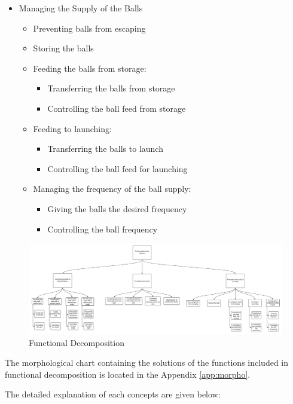 \documentclass[12pt]{article}
\begin{document}
\begin{itemize}
    \item Managing the Supply of the Balls
    \begin{itemize}
        \item Preventing balls from escaping
        \item Storing the balls
        \item Feeding the balls from storage:
        \begin{itemize}
            \item Transferring the balls from storage
            \item Controlling the ball feed from storage
        \end{itemize}
        \item Feeding to launching:
        \begin{itemize}
            \item Transferring the balls to launch
            \item Controlling the ball feed for launching
        \end{itemize}
        \item Managing the frequency of the ball supply:
        \begin{itemize}
            \item Giving the balls the desired frequency
            \item Controlling the ball frequency
        \end{itemize}
    \end{itemize}
\end{itemize}

\begin{figure}[H]
    \centering
    \includegraphics[width=0.9\linewidth]{fd.jpeg}
    \caption{Functional Decomposition}
    \label{fig:fd}
\end{figure}

The morphological chart containing the solutions of the functions included in functional decomposition is located in the Appendix \ref{app:morpho}.

The detailed explanation of each concepts are given below:
\end{document}
